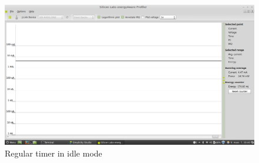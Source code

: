 \begin{figure}[H]
  \centering
  \includegraphics[clip, trim=0cm 13cm 0cm 3.5cm, width=12cm]{fig/Timer1Idle.png}
  \caption{Regular timer in idle mode}
\end{figure}

